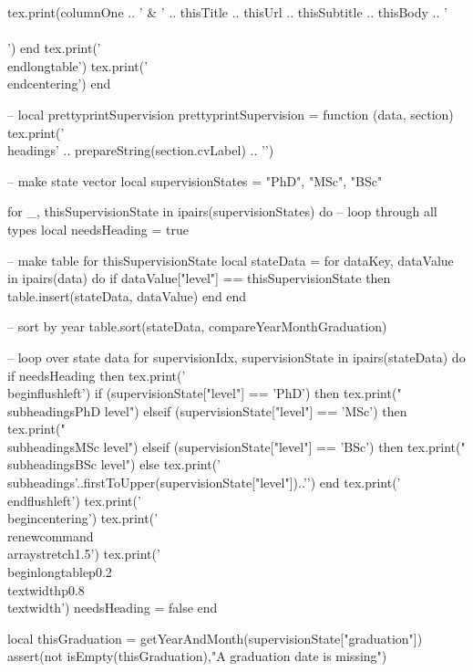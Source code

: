 \documentclass[letterpaper, 10pt]{article}
\newcommand{\headings}[1]{\section*{#1} \hrule \vspace{10pt}}
\newcommand{\subheadings}[1]{\textbf{#1} \vspace{5pt}}
\begin{document}
\begin{luacode}
			tex.print(columnOne .. ' & ' .. thisTitle .. thisUrl .. thisSubtitle .. thisBody .. ' \\\\')
		end
		tex.print('\\end{longtable}')
		tex.print('\\end{centering}')
	end

	-- local prettyprintSupervision
	prettyprintSupervision = function (data, section)
		tex.print('\\headings{' .. prepareString(section.cvLabel) .. '}')

		-- make state vector
		local supervisionStates = {"PhD", "MSc", "BSc"}

		for _, thisSupervisionState in ipairs(supervisionStates) do 											-- loop through all types
			local needsHeading = true

			-- make table for thisSupervisionState
			local stateData = {}
			for dataKey, dataValue in ipairs(data) do
				if dataValue["level"] == thisSupervisionState then
					table.insert(stateData, dataValue)
				end
			end

			-- sort by year
			table.sort(stateData, compareYearMonthGraduation)

			-- loop over state data
			for supervisionIdx, supervisionState in ipairs(stateData) do
				if needsHeading then
					tex.print('\\begin{flushleft}')
					if (supervisionState["level"] == 'PhD') then
						tex.print("\\subheadings{PhD level}")
					elseif (supervisionState["level"] == 'MSc') then
						tex.print("\\subheadings{MSc level}")
					elseif (supervisionState["level"] == 'BSc') then
						tex.print("\\subheadings{BSc level}")
					else
						tex.print('\\subheadings{'..firstToUpper(supervisionState["level"])..'}')
					end
					tex.print('\\end{flushleft}')
					tex.print('\\begin{centering}')
					tex.print('\\renewcommand{\\arraystretch}{1.5}')
					tex.print('\\begin{longtable}{p{0.2\\textwidth}p{0.8\\textwidth}}')
					needsHeading = false
				end

				local thisGraduation = getYearAndMonth(supervisionState["graduation"])
				assert(not isEmpty(thisGraduation),"A graduation date is missing")


\end{luacode}
\end{document}
